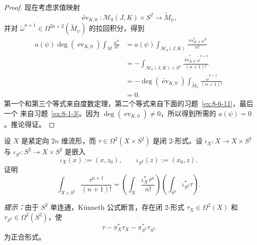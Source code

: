 \begin{proof}
现在考虑求值映射
\[
  \widetilde{\operatorname{ev}}_{K,0}:
  \mathcal M_0(J,K)\times S^2\longrightarrow\widetilde M_\psi,
\]
并对 $\widetilde\omega^{n+1}\in
\Omega^{2n+2}(\widetilde M_\psi)$ 的拉回积分，得到
\[
\begin{aligned}
  a(\psi)\deg(\operatorname{ev}_{K,0})
  \int_M\frac{\omega^n}{n!}
  &=
  a(\psi)\int_{\mathcal M_0(J,K)}
  \frac{\operatorname{ev}_{K,0}^*\omega^n}{n!}\\
  &=-\int_{\mathcal M_0(J,K)\times S^2}
  \frac{\widetilde{\operatorname{ev}}_{K,0}^*
  \widetilde\omega^{n+1}}{(n+1)!}\\
  &=-\deg(\widetilde{\operatorname{ev}}_{K,0})
  \int_{\widetilde M_\psi}
  \frac{\widetilde\omega^{n+1}}{(n+1)!}\\
  &=0.
\end{aligned}
\]
第一个和第三个等式来自度数定理，第二个等式来自下面的习题~\ref{ex:8-6-11}，最后一个
来自习题~\ref{ex:8-1-3}。因为
$\deg(\operatorname{ev}_{K,0})\ne0$，所以得到所需的 $a(\psi)=0$。推论得证。
\end{proof}

\begin{exercise}\label{ex:8-6-11}
设 $X$ 是紧定向 $2n$ 维流形，而
$\tau\in\Omega^2(X\times S^2)$ 是闭 2-形式。设
$\iota_X:X\to X\times S^2$ 与
$\iota_{S^2}:S^2\to X\times S^2$ 是嵌入
\[
  \iota_X(x):=(x,z_0),\qquad
  \iota_{S^2}(z):=(x_0,z).
\]
证明
\[
  \int_{X\times S^2}\frac{\tau^{n+1}}{(n+1)!}
  =
  \left(\int_X\frac{\iota_X^*\tau^n}{n!}\right)
  \left(\int_{S^2}\iota_{S^2}^*\tau\right).
\]

\emph{提示：}由于 $S^2$ 单连通，Künneth 公式断言，存在闭 2-形式
$\tau_X\in\Omega^2(X)$ 和 $\tau_{S^2}\in\Omega^2(S^2)$，使
\[
  \tau-\pi_X^*\tau_X-\pi_{S^2}^*\tau_{S^2}
\]
为正合形式。
\end{exercise}

